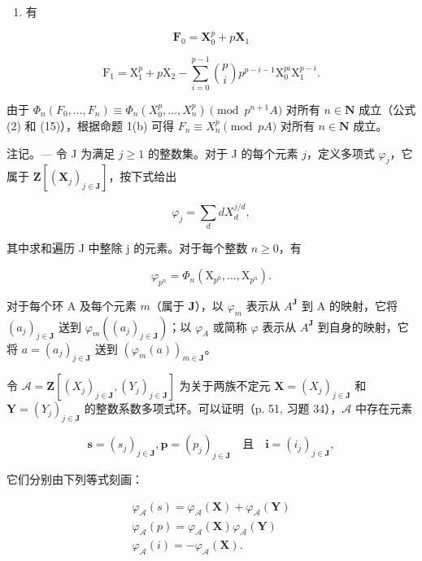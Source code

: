 \begin{enumerate}
\def\labelenumi{\arabic{enumi})}
\setcounter{enumi}{3}
\tightlist
\item
  有
\end{enumerate}

\[
\mathbf {F} _ {0} = \mathbf {X} _ {0} ^ {p} + p \mathbf {X} _ {1}
\]

\[
\mathrm{F} _ {1} = \mathrm{X} _ {1} ^ {p} + p \mathrm{X} _ {2} - \sum_ {i = 0} ^ {p - 1} \binom {p} {i} p ^ {p - i - 1} \mathrm{X} _ {0} ^ {p i} \mathrm{X} _ {1} ^ {p - i}.
\]

  由于 \(\Phi_n(F_0, \ldots, F_n) \equiv \Phi_n(X_0^p, \ldots, X_n^p) \pmod{p^{n+1}A}\) 对所有 \(n \in \mathbf{N}\) 成立（公式 (2) 和 (15)），根据命题 1(b) 可得 \(F_n \equiv X_n^p \pmod{pA}\) 对所有 \(n \in \mathbf{N}\) 成立。

 注记。--- 令 J 为满足 \(j \geqslant 1\) 的整数集。对于 J 的每个元素 \(j\)，定义多项式 \(\varphi_j\)，它属于 \(\mathbf{Z}[(\mathbf{X}_j)_{j \in \mathbf{J}}]\)，按下式给出

\[
\varphi_ {j} = \sum_ {d} d X _ {d} ^ {j / d},
\]

其中求和遍历 J 中整除 j 的元素。对于每个整数 \(n \geqslant 0\)，有

\[
\varphi_ {p ^ {n}} = \Phi_ {n} (\mathrm{X} _ {p ^ {0}},..., \mathrm{X} _ {p ^ {n}}).
\]

对于每个环 A 及每个元素 \(m\)（属于 \(\mathbf{J}\)），以 \(\varphi_{m}\) 表示从 \(A^{\mathbf{J}}\) 到 A 的映射，它将 \((a_{j})_{j\in\mathbf{J}}\) 送到 \(\varphi_{m}((a_{j})_{j\in\mathbf{J}})\)；以 \(\varphi_{A}\) 或简称 \(\varphi\) 表示从 \(A^{\mathbf{J}}\) 到自身的映射，它将 \(a = (a_{j})_{j\in\mathbf{J}}\) 送到 \((\varphi_{m}(a))_{m\in\mathbf{J}}\)。

令 \(\mathcal{A} = \mathbf{Z}[(X_j)_{j\in\mathbf{J}},(Y_j)_{j\in\mathbf{J}}]\) 为关于两族不定元 \(\mathbf{X} = (X_j)_{j\in\mathbf{J}}\) 和 \(\mathbf{Y} = (Y_j)_{j\in\mathbf{J}}\) 的整数系数多项式环。可以证明（p. 51, 习题 34），\(\mathcal{A}\) 中存在元素

\[
\boldsymbol {s} = (s _ {j}) _ {j \in \mathbf {J}}, \boldsymbol {p} = (p _ {j}) _ {j \in \mathbf {J}} \quad \text{且} \quad \boldsymbol {i} = (i _ {j}) _ {j \in \mathbf {J}},
\]

它们分别由下列等式刻画：

\[
\begin{array}{l} \varphi_ {\mathcal {A}} (s) = \varphi_ {\mathcal {A}} (\mathbf {X}) + \varphi_ {\mathcal {A}} (\mathbf {Y}) \\ \varphi_ {\mathcal {A}} (p) = \varphi_ {\mathcal {A}} (\mathbf {X}) \varphi_ {\mathcal {A}} (\mathbf {Y}) \\ \varphi_ {\mathcal {A}} (i) = - \varphi_ {\mathcal {A}} (\mathbf {X}). \end{array}
\]

